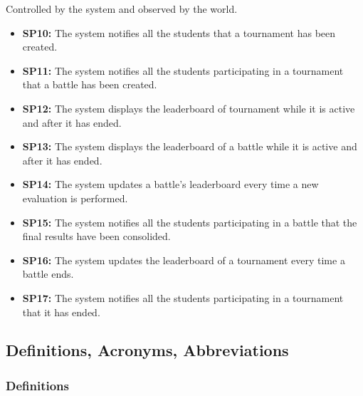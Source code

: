 \documentclass{article}
\begin{document}
Controlled by the system and observed by the world.

\begin{itemize}
    \item \textbf{SP10:} The system notifies all the students that a tournament has been created.
    \item \textbf{SP11:} The system notifies all the students participating in a tournament that a battle has been created.
    \item \textbf{SP12:} The system displays the leaderboard of tournament while it is active and after it has ended.
    \item \textbf{SP13:} The system displays the leaderboard of a battle while it is active and after it has ended.
    \item \textbf{SP14:} The system updates a battle's leaderboard every time a new evaluation is performed.
    \item \textbf{SP15:} The system notifies all the students participating in a battle that the final results have been consolided.
    \item \textbf{SP16:} The system updates the leaderboard of a tournament every time a battle ends.
    \item \textbf{SP17:} The system notifies all the students participating in a tournament that it has ended.
\end{itemize}

\newpage

\subsection{Definitions, Acronyms, Abbreviations}

\subsubsection{Definitions}
 
\end{document}
